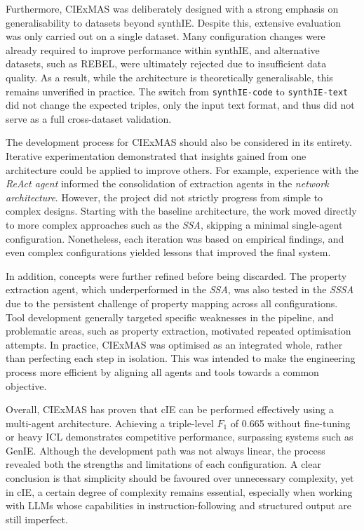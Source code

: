 \documentclass[a4paper,oneside,bibliography=totoc]{scrbook}
\begin{document}
Furthermore, CIExMAS was deliberately designed with a strong emphasis on generalisability to datasets beyond synthIE. Despite this, extensive evaluation was only carried out on a single dataset. Many configuration changes were already required to improve performance within synthIE, and alternative datasets, such as REBEL, were ultimately rejected due to insufficient data quality. As a result, while the architecture is theoretically generalisable, this remains unverified in practice. The switch from \texttt{synthIE-code} to \texttt{synthIE-text} did not change the expected triples, only the input text format, and thus did not serve as a full cross-dataset validation.

The development process for CIExMAS should also be considered in its entirety. Iterative experimentation demonstrated that insights gained from one architecture could be applied to improve others. For example, experience with the \textit{\ac{ReAct} agent} informed the consolidation of extraction agents in the \textit{network architecture}. However, the project did not strictly progress from simple to complex designs. Starting with the baseline architecture, the work moved directly to more complex approaches such as the \textit{\ac{SSA}}, skipping a minimal single-agent configuration. Nonetheless, each iteration was based on empirical findings, and even complex configurations yielded lessons that improved the final system.

In addition, concepts were further refined before being discarded. The property extraction agent, which underperformed in the \textit{\ac{SSA}}, was also tested in the \textit{\ac{SSSA}} due to the persistent challenge of property mapping across all configurations. Tool development generally targeted specific weaknesses in the pipeline, and problematic areas, such as property extraction, motivated repeated optimisation attempts. In practice, CIExMAS was optimised as an integrated whole, rather than perfecting each step in isolation. This was intended to make the engineering process more efficient by aligning all agents and tools towards a common objective.

Overall, CIExMAS has proven that \ac{cIE} can be performed effectively using a multi-agent architecture. Achieving a triple-level $F_{1}$ of 0.665 without fine-tuning or heavy \ac{ICL} demonstrates competitive performance, surpassing systems such as GenIE. Although the development path was not always linear, the process revealed both the strengths and limitations of each configuration. A clear conclusion is that simplicity should be favoured over unnecessary complexity, yet in \ac{cIE}, a certain degree of complexity remains essential, especially when working with \acp{LLM} whose capabilities in instruction-following and structured output are still imperfect.
\end{document}
